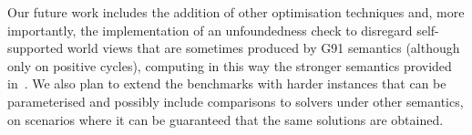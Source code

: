 \documentclass{new_tlp}
\begin{document}
Our future work includes the addition of other optimisation techniques and, more importantly, the implementation of an unfoundedness check to disregard self-supported world views that are sometimes produced by G91 semantics (although only on positive cycles), computing in this way the stronger semantics provided in~\cite{cafafa19b}.
%
We also plan to extend the benchmarks with harder instances that can be parameterised and possibly include comparisons to solvers under other semantics, on scenarios where it can be guaranteed that the same solutions are obtained.



\end{document}
